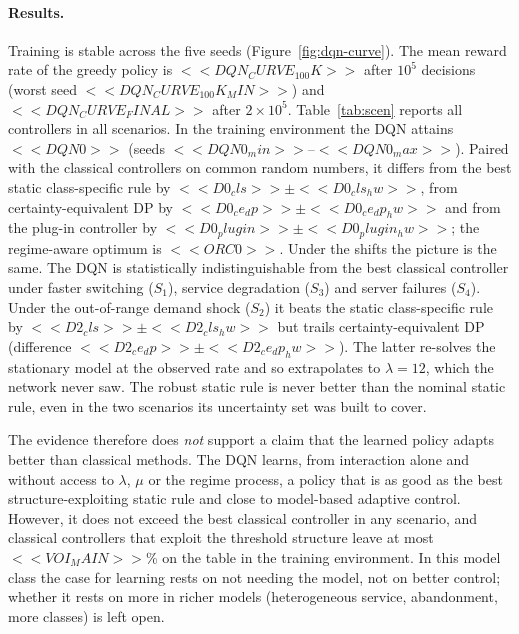 \paragraph{Results.} Training is stable across the five seeds (Figure~\ref{fig:dqn-curve}). The mean reward rate of the greedy policy is $<<DQN_CURVE_100K>>$ after $10^5$ decisions (worst seed $<<DQN_CURVE_100K_MIN>>$) and $<<DQN_CURVE_FINAL>>$ after $2\times10^5$. Table~\ref{tab:scen} reports all controllers in all scenarios. In the training environment the DQN attains $<<DQN0>>$ (seeds $<<DQN0_min>>$--$<<DQN0_max>>$). Paired with the classical controllers on common random numbers, it differs from the best static class-specific rule by $<<D0_cls>>\pm<<D0_cls_hw>>$, from certainty-equivalent DP by $<<D0_ce_dp>>\pm<<D0_ce_dp_hw>>$ and from the plug-in controller by $<<D0_plugin>>\pm<<D0_plugin_hw>>$; the regime-aware optimum is $<<ORC0>>$. Under the shifts the picture is the same. The DQN is statistically indistinguishable from the best classical controller under faster switching ($S_1$), service degradation ($S_3$) and server failures ($S_4$). Under the out-of-range demand shock ($S_2$) it beats the static class-specific rule by $<<D2_cls>>\pm<<D2_cls_hw>>$ but trails certainty-equivalent DP (difference $<<D2_ce_dp>>\pm<<D2_ce_dp_hw>>$). The latter re-solves the stationary model at the observed rate and so extrapolates to $\lambda=12$, which the network never saw. The robust static rule is never better than the nominal static rule, even in the two scenarios its uncertainty set was built to cover.

The evidence therefore does \emph{not} support a claim that the learned policy adapts better than classical methods. The DQN learns, from interaction alone and without access to $\lambda$, $\mu$ or the regime process, a policy that is as good as the best structure-exploiting static rule and close to model-based adaptive control. However, it does not exceed the best classical controller in any scenario, and classical controllers that exploit the threshold structure leave at most $<<VOI_MAIN>>$\% on the table in the training environment. In this model class the case for learning rests on not needing the model, not on better control; whether it rests on more in richer models (heterogeneous service, abandonment, more classes) is left open.

\begin{table}[t]
\centering\small
\caption{Extended model: reward rate of each controller in the training environment $S_0$ and under four shifts (no retraining). Mean $\pm$ 95\% half-width over 10 replications of 10{,}000 time units (DQN: over 5 seeds). Bold: best implementable controller in each column. The oracle observes the hidden regime and is not implementable.}\label{tab:scen}
\end{table}

